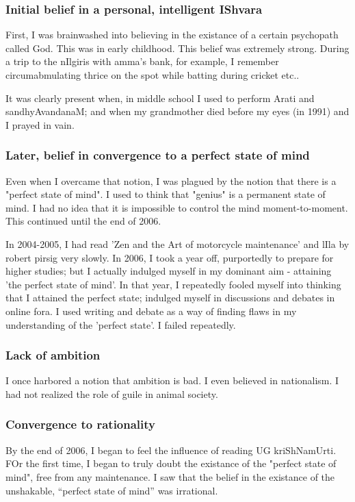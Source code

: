 \documentclass[oneside, article]{memoir}
\begin{document}
\subsubsection{Initial belief in a personal, intelligent IShvara}
First, I was brainwashed into believing in the existance of a certain psychopath called God. This was in early childhood. This belief was extremely strong. During a trip to the nIlgiris with amma's bank, for example, I remember circumabmulating thrice on the spot while batting during cricket etc..

It was clearly present when, in middle school I used to perform Arati and sandhyAvandanaM; and when my grandmother died before my eyes (in 1991) and I prayed in vain.

\subsubsection{Later, belief in convergence to a perfect state of mind}
Even when I overcame that notion, I was plagued by the notion that there is a "perfect state of mind". I used to think that "genius" is a permanent state of mind. I had no idea that it is impossible to control the mind moment-to-moment. This continued until the end of 2006.

In 2004-2005, I had read 'Zen and the Art of motorcycle maintenance' and lIla by robert pirsig very slowly. In 2006, I took a year off, purportedly to prepare for higher studies; but I actually indulged myself in my dominant aim - attaining 'the perfect state of mind'. In that year, I repeatedly fooled myself into thinking that I attained the perfect state; indulged myself in discussions and debates in online fora. I used writing and debate as a way of finding flaws in my understanding of the 'perfect state'. I failed repeatedly.

\subsubsection{Lack of ambition}
I once harbored a notion that ambition is bad. I even believed in nationalism. I had not realized the role of guile in animal society.

\subsubsection{Convergence to rationality}
By the end of 2006, I began to feel the influence of reading UG kriShNamUrti. FOr the first time, I began to truly doubt the existance of the "perfect state of mind", free from any maintenance. I saw that the belief in the existance of the unshakable, ``perfect state of mind'' was irrational.
\end{document}
